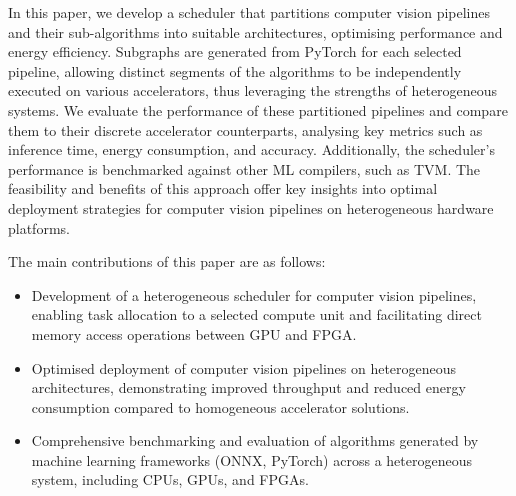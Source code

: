 \documentclass[]{spie}  %
\begin{document}
In this paper, we develop a scheduler that partitions computer vision pipelines and their sub-algorithms into suitable architectures, optimising performance and energy efficiency. Subgraphs are generated from PyTorch for each selected pipeline, allowing distinct segments of the algorithms to be independently executed on various accelerators, thus leveraging the strengths of heterogeneous systems. We evaluate the performance of these partitioned pipelines and compare them to their discrete accelerator counterparts, analysing key metrics such as inference time, energy consumption, and accuracy. Additionally, the scheduler's performance is benchmarked against other ML compilers, such as TVM. The feasibility and benefits of this approach offer key insights into optimal deployment strategies for computer vision pipelines on heterogeneous hardware platforms.




The main contributions of this paper are as follows:
\begin{itemize}
\item Development of a heterogeneous scheduler for computer vision pipelines, enabling task allocation to a selected compute unit and facilitating direct memory access operations between GPU and FPGA.
\item Optimised deployment of computer vision pipelines on heterogeneous architectures, demonstrating improved throughput and reduced energy consumption compared to homogeneous accelerator solutions.
\item Comprehensive benchmarking and evaluation of algorithms generated by machine learning frameworks (ONNX, PyTorch) across a heterogeneous system, including CPUs, GPUs, and FPGAs.
\end{itemize}

\newpage
\end{document}
